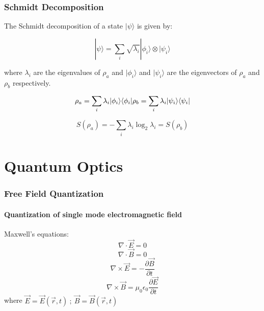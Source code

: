 \documentclass[
  letterpaper,
  DIV=11,
  numbers=noendperiod]{scrreprt}
\begin{document}
\subsection*{Schmidt Decomposition}\label{schmidt-decomposition}

The Schmidt decomposition of a state \(|\psi\rangle\) is given by:

\[ |\psi\rangle = \sum_{i} \sqrt{\lambda_i} |\phi_i\rangle \otimes |\psi_i\rangle \]

where \(\lambda_i\) are the eigenvalues of \(\rho_a\) and
\(|\phi_i\rangle\) and \(|\psi_i\rangle\) are the eigenvectors of
\(\rho_a\) and \(\rho_b\) respectively.

\[\rho_a = \sum_{i} \lambda_i |\phi_i\rangle \langle \phi_i |\\
\rho_b = \sum_{i} \lambda_i |\psi_i\rangle \langle \psi_i |\]

\[ S(\rho_a) = -\sum_{i} \lambda_i \log_2 \lambda_i = S(\rho_b) \]


\chapter*{Quantum Optics}\label{quantum-optics}


\subsection*{Free Field Quantization}\label{free-field-quantization}

\subsubsection*{Quantization of single mode electromagnetic
field}\label{quantization-of-single-mode-electromagnetic-field}

Maxwell's equations: \[\nabla \cdot \vec{E} = 0\]
\[\nabla \cdot \vec{B} = 0\]
\[\nabla \times \vec{E} = -\frac{\partial \vec{B}}{\partial t}\]
\[\nabla \times \vec{B} = \mu_0 \epsilon_0 \frac{\partial \vec{E}}{\partial t}\]
where
\(\vec{E} = \vec{E}(\vec{r}, t)\ ;\ \vec{B} = \vec{B}(\vec{r}, t)\)
\end{document}
